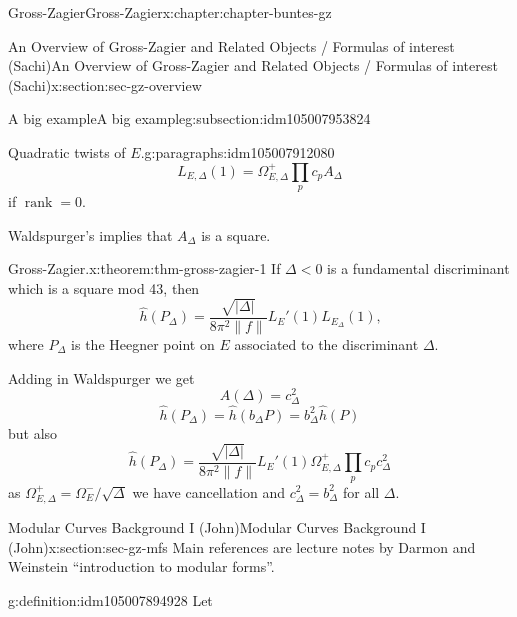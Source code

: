 \documentclass[oneside,10pt,]{book}
\numberwithin{equation}{section}
\DeclareMathOperator{\rank}{rank}
\newcommand{\lt}{<}
\begin{document}
\begin{chapterptx}{Gross-Zagier}{}{Gross-Zagier}{}{}{x:chapter:chapter-buntes-gz}
\begin{sectionptx}{An Overview of Gross-Zagier and Related Objects \slash{} Formulas of interest (Sachi)}{}{An Overview of Gross-Zagier and Related Objects \slash{} Formulas of interest (Sachi)}{}{}{x:section:sec-gz-overview}
\begin{subsectionptx}{A big example}{}{A big example}{}{}{g:subsection:idm105007953824}
\begin{paragraphs}{Quadratic twists of \(E\).}{g:paragraphs:idm105007912080}
\begin{equation*}
L_{E,\Delta } (1) = \Omega _{E,\Delta }^+  \prod_p c_p A_\Delta
\end{equation*}
if \(\rank = 0\).%
\par
Waldspurger's implies that \(A_\Delta \) is a square.%
\end{paragraphs}%
\begin{theorem}{Gross-Zagier.}{}{x:theorem:thm-gross-zagier-1}%
If \(\Delta \lt  0 \) is a fundamental discriminant which is a square mod 43, then%
\begin{equation*}
\hat h(P_\Delta ) = \frac{\sqrt{|\Delta |}}{8\pi ^2 \| f\|} L_E'(1) L_{E_\Delta }(1)\text{,}
\end{equation*}
where \(P_\Delta \) is the Heegner point on \(E\) associated to the discriminant \(\Delta \).%
\end{theorem}
Adding in Waldspurger we get%
\begin{equation*}
A(\Delta ) = c_\Delta ^2
\end{equation*}
%
\begin{equation*}
\hat h(P_\Delta )= \hat h(b_\Delta  P) = b_\Delta ^2\hat h(P)
\end{equation*}
but also%
\begin{equation*}
\hat h(P_\Delta ) = \frac{\sqrt{|\Delta |}}{8\pi ^2 \| f\|} L_E'(1) \Omega _{E,\Delta }^+ \prod_p c_p c_\Delta^2
\end{equation*}
as \(\Omega _{E,\Delta }^+ = \Omega _E^-  / \sqrt \Delta \) we have cancellation and \(c_\Delta ^2 = b_\Delta ^2\) for all \(\Delta \).%
\end{subsectionptx}
\end{sectionptx}
%
%
\typeout{************************************************}
\typeout{************************************************}
%
\begin{sectionptx}{Modular Curves Background I (John)}{}{Modular Curves Background I (John)}{}{}{x:section:sec-gz-mfs}
Main references are lecture notes by Darmon and Weinstein ``introduction to modular forms''.%
\begin{definition}{}{g:definition:idm105007894928}%
Let%
\begin{equation*}

\end{equation*}
\end{definition}
\end{sectionptx}
\end{chapterptx}
\end{document}
